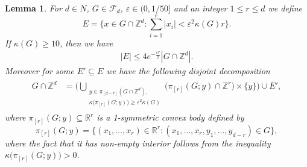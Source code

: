 \documentclass[a4paper,oneside, reqno]{amsart}
\numberwithin{equation}{section}
\newtheorem{Lem}[Thm]{Lemma}
\theoremstyle{definition}%
\theoremstyle{definition}
\theoremstyle{definition}%
\theoremstyle{definition}
\newcommand{\Z}{\mathbb{Z}}
\newcommand{\R}{\mathbb{R}}
\begin{document}
\begin{Lem}
\label{decomp}
For $d \in N$, $G \in \mathcal{F}_d$, $\varepsilon\in(0, 1/50]$ and an integer $1\le r\le d$  we define
\[
E=\{x\in G\cap\Z^d\colon \sum_{i=1}^r|x_i|<\varepsilon^2\kappa(G)r\}.
\]
If $\kappa(G)\ge10$, then we have
\begin{align}
  \label{eq:pre-decomp}
  |E|\le 4e^{-\frac{\varepsilon r}{2}}|G\cap\Z^d|.
\end{align}
Moreover for some $E' \subseteq E$ we have the following disjoint decomposition
\begin{align}
  \label{eq:decomp}
  \begin{split}
  G\cap\Z^d&=\Bigg(\bigcup_{\substack{y \in \pi_{[d-r]}(G \cap \Z^d), \\ 
  \kappa\big(\pi_{[r]}(G;y)\big) \ge \varepsilon^2 \kappa(G)}}\Big(\pi_{[r]}(G;y) \cap \Z^r \Big) \times  \{y\} \Bigg)\cup E',
  \end{split}
  \end{align}
  where $\pi_{[r]}(G;y) \subseteq \R^r$ is a 1-symmetric convex body defined by
  \[
  \pi_{[r]}(G;y)= \Big\{ (x_1,\ldots, x_r) \in \R^r: (x_1,\ldots,x_r,y_1,\ldots,y_{d-r}) \in G \Big\},
  \]
  where the fact that it has non-empty interior follows from the inequality $ \kappa\big(\pi_{[r]}(G;y)\big)>0$. 
\end{Lem}
\end{document}

